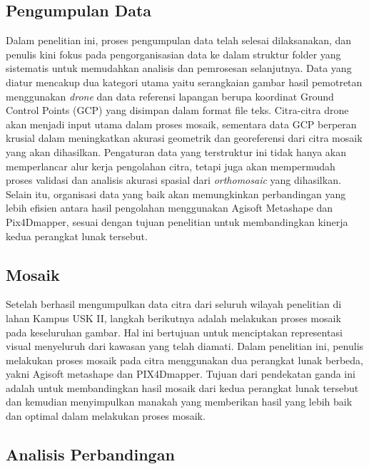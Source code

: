 \subsection{Pengumpulan Data}
Dalam penelitian ini, proses pengumpulan data telah selesai dilaksanakan, dan penulis kini fokus pada pengorganisasian data ke dalam struktur folder yang sistematis untuk memudahkan analisis dan pemrosesan selanjutnya. Data yang diatur mencakup dua kategori utama yaitu serangkaian gambar hasil pemotretan menggunakan \textit{drone} dan data referensi lapangan berupa koordinat Ground Control Points (GCP) yang disimpan dalam format file teks. Citra-citra drone akan menjadi input utama dalam proses mosaik, sementara data GCP berperan krusial dalam meningkatkan akurasi geometrik dan georeferensi dari citra mosaik yang akan dihasilkan. Pengaturan data yang terstruktur ini tidak hanya akan memperlancar alur kerja pengolahan citra, tetapi juga akan mempermudah proses validasi  dan analisis akurasi spasial dari \textit{orthomosaic} yang dihasilkan. Selain itu, organisasi data yang baik akan memungkinkan perbandingan yang lebih efisien antara hasil pengolahan menggunakan Agisoft Metashape dan Pix4Dmapper, sesuai dengan tujuan penelitian untuk membandingkan kinerja kedua perangkat lunak tersebut.

\subsection{Mosaik}

Setelah berhasil mengumpulkan data citra dari seluruh wilayah penelitian di lahan Kampus 
USK II, langkah berikutnya adalah melakukan proses mosaik pada keseluruhan 
gambar. Hal ini bertujuan untuk menciptakan representasi visual menyeluruh dari 
kawasan yang telah diamati. Dalam penelitian ini, penulis melakukan proses mosaik 
pada citra menggunakan dua perangkat lunak berbeda, yakni Agisoft metashape dan PIX4Dmapper. 
Tujuan dari pendekatan ganda ini adalah untuk membandingkan hasil mosaik dari 
kedua perangkat lunak tersebut dan kemudian menyimpulkan manakah yang 
memberikan hasil yang lebih baik dan optimal dalam melakukan proses mosaik.

\subsection{Analisis Perbandingan}

